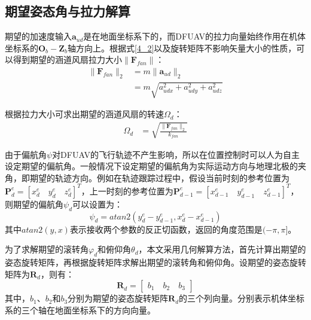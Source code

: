 \subsection{期望姿态角与拉力解算}\label{期望姿态角与拉力解算}

期望的加速度输入$\boldsymbol{a}_{ud}$是在地面坐标系下的，而DFUAV的拉力向量始终作用在机体坐标系的$\boldsymbol{O}_b-\boldsymbol{Z}_b$轴方向上。根据式\eqref{4_2}以及旋转矩阵不影响矢量大小的性质，可以得到期望的涵道风扇拉力大小$\|\boldsymbol{F}_{fan}\|$：
\begin{equation}
    \begin{aligned}
        \|\boldsymbol{F}_{fan}\|_2&=m\|\boldsymbol{a}_{ud}\|_2\\
        &=m\sqrt{a_{udx}^2+a_{udy}^2+a_{udz}^2}
    \end{aligned}
    \label{4_23}
\end{equation}

根据拉力大小可求出期望的涵道风扇的转速$\Omega_d$：
\begin{equation}
    \begin{aligned}
        \Omega_d&=\sqrt{\frac{\|\boldsymbol{F}_{fan}\|_2}{k_{fan}}}
    \end{aligned}
    \label{4_24}
\end{equation}

由于偏航角$\psi$对DFUAV的飞行轨迹不产生影响，所以在位置控制时可以人为自主设定期望的偏航角。一般情况下设定期望的偏航角为实际运动方向与地理北极的夹角，即期望的轨迹方向。例如在轨迹跟踪过程中，假设当前时刻的参考位置为$\boldsymbol{P}^e_d=[x^e_d\quad y^e_d\quad z^e_d]^T$，上一时刻的参考位置为$\boldsymbol{P}^e_{d-1}=[x^e_{d-1}\quad y^e_{d-1}\quad z^e_{d-1}]^T$，则期望的偏航角$\psi_d$可以设置为：
\begin{equation}
    \psi_d=atan2(y_d^e-y_{d-1}^e,x_d^e-x_{d-1}^e)
    \label{4_25}
\end{equation}
其中$atan2(y,x)$表示接收两个参数的反正切函数，返回的角度范围是$(-\pi,\pi]$。

为了求解期望的滚转角$\varphi_d$和俯仰角$\theta_d$，本文采用几何解算方法，首先计算出期望的姿态旋转矩阵，再根据旋转矩阵求解出期望的滚转角和俯仰角。设期望的姿态旋转矩阵为$\boldsymbol{R}_d$，则有：
\begin{equation}
    \boldsymbol{R}_d=\begin{bmatrix}b_1 \quad b_2 \quad b_3\end{bmatrix}
    \label{4_26}
\end{equation}
其中，$b_1$、$b_2$和$b_3$分别为期望的姿态旋转矩阵$\boldsymbol{R}_d$的三个列向量。分别表示机体坐标系的三个轴在地面坐标系下的方向向量。

